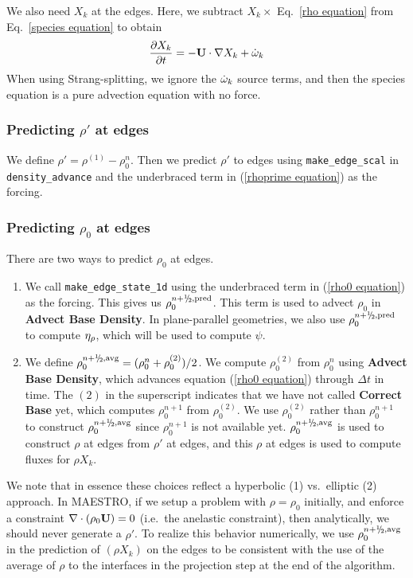 We also need $X_k$ at the edges.  Here, we subtract $X_k \times$
Eq.~\ref{rho equation} from Eq.~\ref{species equation} to obtain
\begin{equation}
\frac{\partial X_k}{\partial t} = -{\bf U} \cdot \nabla X_k + \dot{\omega}_k
\end{equation}
When using Strang-splitting, we ignore the $\dot{\omega}_k$ source terms, and
then the species equation is a pure advection equation with no force.

\subsubsection{Predicting $\rho'$ at edges}
We define $\rho' = \rho^{(1)} - \rho_0^n$.  Then we predict $\rho'$ to
edges using {\tt make\_edge\_scal} in {\tt density\_advance} and the
underbraced term in (\ref{rhoprime equation}) as the forcing.

\subsubsection{Predicting $\rho_0$ at edges}\label{Predicting rho0 at edges}
There are two ways to predict $\rho_0$ at edges.
\begin{enumerate}

\item We call {\tt make\_edge\_state\_1d} using the underbraced term
in (\ref{rho0 equation}) as the forcing.  This gives us
$\rho_0^{n+\myhalf,{\rm pred}}$.  This term is used to advect $\rho_0$
in {\bf Advect Base Density}.  In plane-parallel geometries, we also use
$\rho_0^{n+\myhalf,{\rm pred}}$ to compute $\eta_{\rho}$, which will be used 
to compute $\psi$.

\item We define $\rho_0^{n+\myhalf,{\rm avg}} = (\rho_0^n +
\rho_0^{(2)})/2$.  We compute $\rho_0^{(2)}$ from $\rho_0^n$ using
{\bf Advect Base Density}, which advances equation (\ref{rho0 equation})
through $\Delta t$ in time.  The $(2)$ in the superscript indicates
that we have not called {\bf Correct Base} yet, which computes
$\rho_0^{n+1}$ from $\rho_0^{(2)}$.  We use $\rho_0^{(2)}$ rather than
$\rho_0^{n+1}$ to construct $\rho_0^{n+\myhalf,{\rm avg}}$ since $\rho_0^{n+1}$
is not available yet.  $\rho_0^{n+\myhalf,{\rm avg}}$ is used to construct 
$\rho$ at edges from $\rho'$ at edges, and
this $\rho$ at edges is used to compute fluxes for $\rho X_k$.
\end{enumerate}

We note that in essence these choices reflect a hyperbolic (1)
vs.\ elliptic (2) approach.  In MAESTRO, if we setup a problem with
$\rho = \rho_0$ initially, and enforce a constraint $\nabla \cdot
(\rho_0 {\bf U}) = 0$ (i.e.\ the anelastic constraint), then analytically,
we should never generate a $\rho'$.  To realize this behavior
numerically, we use $\rho_0^{n+\myhalf,{\rm avg}}$ in the prediction
of $(\rho X_k)$ on the edges to be consistent with the use of the
average of $\rho$ to the interfaces in the projection step at the end
of the algorithm.

